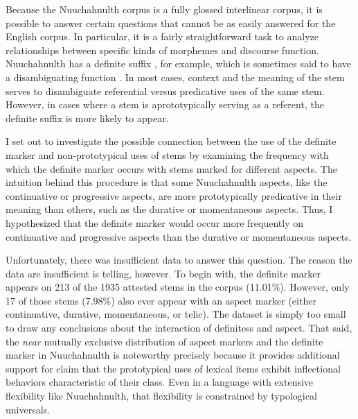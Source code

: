 Because the Nuuchahnulth corpus is a fully glossed interlinear corpus, it is possible to answer certain questions that cannot be as easily answered for the English corpus. In particular, it is a fairly straightforward task to analyze relationships between specific kinds of morphemes and discourse function. Nuuchahnulth has a definite suffix , for example, which is sometimes said to have a disambiguating function \parencite[48]{Nakayama2001} . In most cases, context and the meaning of the stem serves to disambiguate referential versus predicative uses of the same stem. However, in cases where a stem is aprototypically serving as a referent, the definite suffix is more likely to appear.

I set out to investigate the possible connection between the use of the definite marker and non-prototypical uses of stems by examining the frequency with which the definite marker occurs with stems marked for different aspects.  The intuition behind this procedure is that some Nuuchahnulth aspects, like the continuative or progressive aspects, are more prototypically predicative in their meaning than others, such as the durative or momentaneous aspects. Thus, I hypothesized that the definite marker would occur more frequently on continuative and progressive aspects than the durative or momentaneous aspects.

Unfortunately, there was insufficient data to answer this question. The reason the data are insufficient is telling, however. To begin with, the definite marker appears on 213 of the 1935 attested stems in the corpus (11.01\%). However, only 17 of those stems (7.98\%) also ever appear with an aspect marker (either continuative, durative, momentaneous, or telic). The dataset is simply too small to draw any conclusions about the interaction of definitess and aspect. That said, the \emph{near} mutually exclusive distribution of aspect markers and the definite marker in Nuuchahnulth is noteworthy precisely because it provides additional support for \textcite{HopperThompson1984} claim that the prototypical uses of lexical items exhibit inflectional behaviors characteristic of their class. Even in a language with extensive flexibility like Nuuchahnulth, that flexibility is constrained by typological universals.

